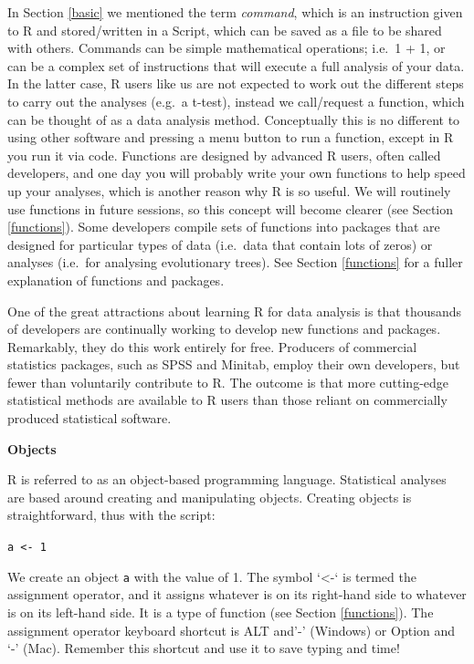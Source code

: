 \documentclass[
]{book}
\begin{document}
In Section \ref{basic} we mentioned the term \emph{command}, which is an instruction given to R and stored/written in a Script, which can be saved as a file to be shared with others. Commands can be simple mathematical operations; i.e.~1 + 1, or can be a complex set of instructions that will execute a full analysis of your data. In the latter case, R users like us are not expected to work out the different steps to carry out the analyses (e.g.~a t-test), instead we call/request a function, which can be thought of as a data analysis method. Conceptually this is no different to using other software and pressing a menu button to run a function, except in R you run it via code. Functions are designed by advanced R users, often called developers, and one day you will probably write your own functions to help speed up your analyses, which is another reason why R is so useful. We will routinely use functions in future sessions, so this concept will become clearer (see Section \ref{functions}). Some developers compile sets of functions into packages that are designed for particular types of data (i.e.~data that contain lots of zeros) or analyses (i.e.~for analysing evolutionary trees). See Section \ref{functions} for a fuller explanation of functions and packages.

One of the great attractions about learning R for data analysis is that thousands of developers are continually working to develop new functions and packages. Remarkably, they do this work entirely for free. Producers of commercial statistics packages, such as SPSS and Minitab, employ their own developers, but fewer than voluntarily contribute to R. The outcome is that more cutting-edge statistical methods are available to R users than those reliant on commercially produced statistical software.

\textbf{Objects}

R is referred to as an object-based programming language. Statistical analyses are based around creating and manipulating objects. Creating objects is straightforward, thus with the script:

\texttt{a\ \textless{}-\ 1}

We create an object \texttt{a} with the value of 1. The symbol `\textless-` is termed the assignment operator, and it assigns whatever is on its right-hand side to whatever is on its left-hand side. It is a type of function (see Section \ref{functions}). The assignment operator keyboard shortcut is ALT and'-' (Windows) or Option and `-' (Mac). Remember this shortcut and use it to save typing and time!
\end{document}
